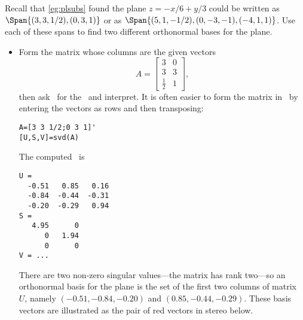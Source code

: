 \begin{example} \label{eg:orthospan}
Recall that \autoref{eg:plsubs} found the plane \(z=-x/6+y/3\) could be written as \(\Span\{(3,3,1/2),(0,3,1)\}\) or as \(\Span\{(5,1,-1/2),(0,-3,-1),(-4,1,1)\}\).
Use each of these spans to find two different orthonormal bases for the plane.
\begin{solution} 
\begin{itemize}
\item Form the matrix whose columns are the given vectors
\begin{equation*}
A=\begin{bmatrix} 3&0\\3&3\\\frac12&1 \end{bmatrix},
\end{equation*}
then ask \script\ for the \svd\ and interpret.
It is often easier to form the matrix in \script\ by entering the vectors as rows and then transposing:
\begin{verbatim}
A=[3 3 1/2;0 3 1]'
[U,S,V]=svd(A)
\end{verbatim}
\setbox\ajrqrbox\hbox{}%
\marginpar{\usebox{\ajrqrbox}}%
The computed \svd\ is \twodp
\begin{verbatim}
U =
  -0.51   0.85   0.16
  -0.84  -0.44  -0.31
  -0.20  -0.29   0.94
S =
   4.95      0
      0   1.94
      0      0
V = ...
\end{verbatim}
There are two non-zero singular values---the matrix has rank two---so an orthonormal basis for the plane is the set of the first two columns of matrix~\(U\), namely  \((-0.51,-0.84,-0.20)\) and \((0.85,-0.44,-0.29)\).
These basis vectors are illustrated as the pair of red vectors in stereo below.
\begin{center}
 {}%
\end{center}


\end{itemize}
\end{solution}
\end{example}
